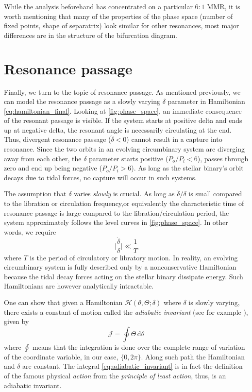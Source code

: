 While the analysis beforehand has concentrated on a particular $6:1$ MMR, it is 
worth mentioning 
that many of the properties of the phase space (number of fixed points, shape of
separatrix) look similar for other 
resonances, most major differences are in the structure of the bifurcation diagram.

\section{Resonance passage}
\label{sec:Resonance_passage}
Finally, we turn to the topic of resonance passage. As mentioned previously, we
can model the resonance passage as a slowly varying $\delta$ parameter in Hamiltonian 
\ref{eq:hamiltonian_final}. 
Looking at \cref{fig:phase_space}, an immediate consequence of the resonant
passage is visible. If the system starts at positive delta and ends up at
negative delta, the resonant angle is necessarily circulating at the end. 
Thus, divergent
resonance passage ($\dot{\delta}<0$) cannot result in a capture into resonance.
Since the two orbits in an evolving circumbinary system
are diverging away from each other, the $\delta$ parameter starts positive 
($P_o/P_i<6$), passes through zero and end up being negative ($P_o/P_i>6$).
As long as the stellar binary's orbit decays due to tidal forces, no capture 
will occur in such systems.

The assumption that $\delta$ varies \emph{slowly} is crucial. As long as
$\dot{\delta}/\delta$ is small compared to the libration or circulation 
frequency,or equivalently the characteristic time of resonance passage
is large compared to the libration/circulation period, the system 
approximately follows the level curves in \cref{fig:phase_space}. In 
other words, we require 
\begin{equation}
    \bigg\lvert\frac{\dot{\delta}}{\delta}\bigg\rvert \ll \frac{1}{T} 
    \label{eq:adabatic_criterion}
\end{equation}
where $T$ is the period of circulatory or libratory motion.
In reality, an evolving circumbinary system is fully 
described only by a nonconservative Hamiltonian because the tidal decay
forces acting on the stellar binary dissipate energy. Such Hamiltonians
are however analytically intractable.

One can show that given a Hamiltonian $\mathcal{H}(\theta,\Theta;\delta)$
where $\delta$ is slowly varying, there exists a constant of motion
called the \emph{adiabatic invariant} (see for example \cite{landau}),
given by
\begin{equation}
    \mathcal{J}=\oint \Theta\,\mathrm{d}\theta    
    \label{eq:adiabatic_invariant}
\end{equation}
where $\oint$ means that the integration is done over the complete range
of variation of the coordinate variable, in our case, $\{0,2\pi\}$. Along
such  path the Hamiltonian and $\delta$ are constant. The integral
\ref{eq:adiabatic_invariant} is in fact the definition of the famous
physical \emph{action} from the \emph{principle of least action}, thus, 
is an adiabatic invariant.

